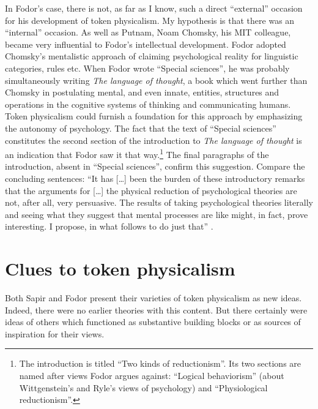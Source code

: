 \documentclass[output=paper]{langscibook}
\begin{document}
In Fodor's case, there is not, as far as I know, such a direct ``external'' occasion for his development of token physicalism. My hypothesis is that there was an ``internal'' occasion. As well as Putnam, Noam Chomsky, his MIT colleague, became very influential to Fodor's intellectual development. Fodor adopted Chomsky's mentalistic approach of claiming psychological reality for linguistic categories, rules etc. When Fodor wrote ``Special sciences'', he was probably simultaneously writing \emph{The language of thought}, a book which went further than Chomsky in postulating mental, and even innate, entities, structures and operations in the cognitive systems of thinking and communicating humans. Token physicalism could furnish a foundation for this approach by emphasizing the autonomy of psychology. The fact that the text of ``Special sciences'' constitutes the second section of the introduction to \emph{The language of thought} is an indication that Fodor saw it that way.\footnote{The introduction is titled ``Two kinds of reductionism''. Its two sections are named after views Fodor argues against: ``Logical behaviorism'' (about Wittgenstein's and Ryle's views of psychology) and ``Physiological reductionism''.} The final paragraphs of the introduction, absent in ``Special sciences'', confirm this suggestion. Compare the concluding sentences: ``It has […] been the burden of these introductory remarks that the arguments for […] the physical reduction of psychological theories are not, after all, very persuasive. The results of taking psychological theories literally and seeing what they suggest that mental processes are like might, in fact, prove interesting. I propose, in what follows to do just that'' \citep[26]{Fodor1975}.

\section{Clues to token physicalism}
\label{sec:elffers:clues}

Both Sapir and Fodor present their varieties of token physicalism as new ideas. Indeed, there were no earlier theories with this content. But there certainly were ideas of others which functioned as substantive building blocks or as sources of inspiration for their views.
\end{document}

